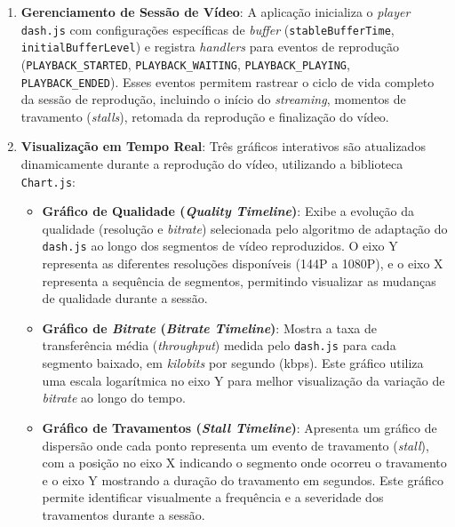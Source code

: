 \begin{enumerate}
    \item \textbf{Gerenciamento de Sessão de Vídeo}: A aplicação inicializa o \textit{player} \texttt{dash.js} com configurações específicas de \textit{buffer} (\texttt{stableBufferTime}, \texttt{initialBufferLevel}) e registra \textit{handlers} para eventos de reprodução (\texttt{PLAYBACK\_STARTED}, \texttt{PLAYBACK\_WAITING}, \texttt{PLAYBACK\_PLAYING}, \texttt{PLAYBACK\_ENDED}). Esses eventos permitem rastrear o ciclo de vida completo da sessão de reprodução, incluindo o início do \textit{streaming}, momentos de travamento (\textit{stalls}), retomada da reprodução e finalização do vídeo.
    
    \item \textbf{Visualização em Tempo Real}: Três gráficos interativos são atualizados dinamicamente durante a reprodução do vídeo, utilizando a biblioteca \texttt{Chart.js}:
    \begin{itemize}
        \item \textbf{Gráfico de Qualidade (\textit{Quality Timeline})}: Exibe a evolução da qualidade (resolução e \textit{bitrate}) selecionada pelo algoritmo de adaptação do \texttt{dash.js} ao longo dos segmentos de vídeo reproduzidos. O eixo Y representa as diferentes resoluções disponíveis (144P a 1080P), e o eixo X representa a sequência de segmentos, permitindo visualizar as mudanças de qualidade durante a sessão.
        
        \item \textbf{Gráfico de \textit{Bitrate} (\textit{Bitrate Timeline})}: Mostra a taxa de transferência média (\textit{throughput}) medida pelo \texttt{dash.js} para cada segmento baixado, em \textit{kilobits} por segundo (kbps). Este gráfico utiliza uma escala logarítmica no eixo Y para melhor visualização da variação de \textit{bitrate} ao longo do tempo.
        
        \item \textbf{Gráfico de Travamentos (\textit{Stall Timeline})}: Apresenta um gráfico de dispersão onde cada ponto representa um evento de travamento (\textit{stall}), com a posição no eixo X indicando o segmento onde ocorreu o travamento e o eixo Y mostrando a duração do travamento em segundos. Este gráfico permite identificar visualmente a frequência e a severidade dos travamentos durante a sessão.
    \end{itemize}
    

\end{enumerate}
